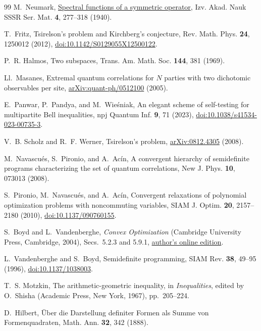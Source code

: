 \documentclass[11pt]{article}
\theoremstyle{remark}\newtheorem{remark}[theorem]{Remark}
\begin{document}
\begin{thebibliography}{99}
M.~Neumark,
\href{https://www.mathnet.ru/eng/im3893}{Spectral functions of a symmetric operator},
Izv. Akad. Nauk SSSR Ser. Mat. \textbf{4}, 277--318 (1940).

T.~Fritz,
Tsirelson's problem and Kirchberg's conjecture,
Rev. Math. Phys. \textbf{24}, 1250012 (2012),
\href{https://doi.org/10.1142/S0129055X12500122}{doi:10.1142/S0129055X12500122}.

P.~R. Halmos,
Two subspaces,
Trans. Am. Math. Soc. \textbf{144}, 381 (1969).

Ll.~Masanes,
Extremal quantum correlations for $N$ parties with two dichotomic observables per site,
\href{https://arxiv.org/abs/quant-ph/0512100}{arXiv:quant-ph/0512100} (2005).

E.~Panwar, P.~Pandya, and M.~Wie\'sniak,
An elegant scheme of self-testing for multipartite Bell inequalities,
npj Quantum Inf. \textbf{9}, 71 (2023), \href{https://doi.org/10.1038/s41534-023-00735-3}{doi:10.1038/s41534-023-00735-3}.

V.~B. Scholz and R.~F. Werner,
Tsirelson's problem,
\href{https://arxiv.org/abs/0812.4305}{arXiv:0812.4305} (2008).

M.~Navascu\'es, S.~Pironio, and A.~Ac\'in,
A convergent hierarchy of semidefinite programs characterizing the set of quantum correlations,
New J. Phys. \textbf{10}, 073013 (2008).

S.~Pironio, M.~Navascu\'es, and A.~Ac\'in,
Convergent relaxations of polynomial optimization problems with noncommuting variables,
SIAM J. Optim. \textbf{20}, 2157--2180 (2010),
\href{https://doi.org/10.1137/090760155}{doi:10.1137/090760155}.

S.~Boyd and L.~Vandenberghe,
\emph{Convex Optimization} (Cambridge University Press, Cambridge, 2004),
Secs.~5.2.3 and 5.9.1,
\href{https://web.stanford.edu/~boyd/cvxbook/}{author's online edition}.

L.~Vandenberghe and S.~Boyd,
Semidefinite programming,
SIAM Rev. \textbf{38}, 49--95 (1996),
\href{https://doi.org/10.1137/1038003}{doi:10.1137/1038003}.

T.~S. Motzkin,
The arithmetic-geometric inequality, in
\emph{Inequalities}, edited by O.~Shisha
(Academic Press, New York, 1967), pp.~205--224.

D.~Hilbert,
\"Uber die Darstellung definiter Formen als Summe von Formenquadraten,
Math. Ann. \textbf{32}, 342 (1888).


\end{thebibliography}
\end{document}
